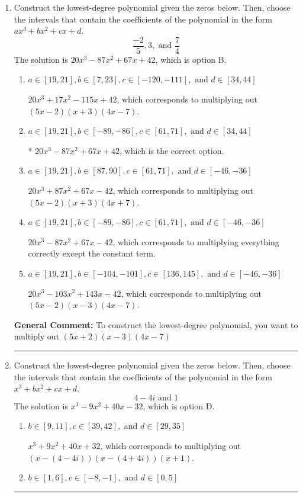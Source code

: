 \documentclass{extbook}[14pt]
\newcommand{\litem}[1]{\item #1

\rule{\textwidth}{0.4pt}}
\begin{document}
\begin{enumerate}\litem{
Construct the lowest-degree polynomial given the zeros below. Then, choose the intervals that contain the coefficients of the polynomial in the form $ax^3+bx^2+cx+d$.
\[ \frac{-2}{5}, 3, \text{ and } \frac{7}{4} \]The solution is \( 20x^{3} -87 x^{2} +67 x + 42 \), which is option B.\begin{enumerate}[label=\Alph*.]
\item \( a \in [19, 21], b \in [7, 23], c \in [-120, -111], \text{ and } d \in [34, 44] \)

$20x^{3} +17 x^{2} -115 x + 42$, which corresponds to multiplying out $(5x -2)(x + 3)(4x -7)$.
\item \( a \in [19, 21], b \in [-89, -86], c \in [61, 71], \text{ and } d \in [34, 44] \)

* $20x^{3} -87 x^{2} +67 x + 42$, which is the correct option.
\item \( a \in [19, 21], b \in [87, 90], c \in [61, 71], \text{ and } d \in [-46, -36] \)

$20x^{3} +87 x^{2} +67 x -42$, which corresponds to multiplying out $(5x -2)(x + 3)(4x + 7)$.
\item \( a \in [19, 21], b \in [-89, -86], c \in [61, 71], \text{ and } d \in [-46, -36] \)

$20x^{3} -87 x^{2} +67 x -42$, which corresponds to multiplying everything correctly except the constant term.
\item \( a \in [19, 21], b \in [-104, -101], c \in [136, 145], \text{ and } d \in [-46, -36] \)

$20x^{3} -103 x^{2} +143 x -42$, which corresponds to multiplying out $(5x -2)(x -3)(4x -7)$.
\end{enumerate}

\textbf{General Comment:} To construct the lowest-degree polynomial, you want to multiply out $(5x + 2)(x -3)(4x -7)$
}
\litem{
Construct the lowest-degree polynomial given the zeros below. Then, choose the intervals that contain the coefficients of the polynomial in the form $x^3+bx^2+cx+d$.
\[ 4 - 4 i \text{ and } 1 \]The solution is \( x^{3} -9 x^{2} +40 x -32 \), which is option D.\begin{enumerate}[label=\Alph*.]
\item \( b \in [9, 11], c \in [39, 42], \text{ and } d \in [29, 35] \)

$x^{3} +9 x^{2} +40 x + 32$, which corresponds to multiplying out $(x-(4 - 4 i))(x-(4 + 4 i))(x + 1)$.
\item \( b \in [1, 6], c \in [-8, -1], \text{ and } d \in [0, 5] \)


\end{enumerate}}
\end{enumerate}
\end{document}
